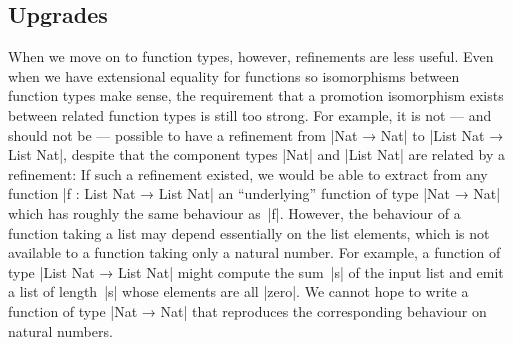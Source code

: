 

\subsection{Upgrades}

When we move on to function types, however, refinements are less useful.
Even when we have extensional equality for functions so isomorphisms between function types make sense, the requirement that a promotion isomorphism exists between related function types is still too strong.
For example, it is not --- and should not be --- possible to have a refinement from |Nat → Nat| to |List Nat → List Nat|, despite that the component types |Nat| and |List Nat| are related by a refinement:
If such a refinement existed, we would be able to extract from any function |f : List Nat → List Nat| an ``underlying'' function of type |Nat → Nat| which has roughly the same behaviour as~|f|.
However, the behaviour of a function taking a list may depend essentially on the list elements, which is not available to a function taking only a natural number.
For example, a function of type |List Nat → List Nat| might compute the sum~|s| of the input list and emit a list of length~|s| whose elements are all |zero|.
We cannot hope to write a function of type |Nat → Nat| that reproduces the corresponding behaviour on natural numbers.


